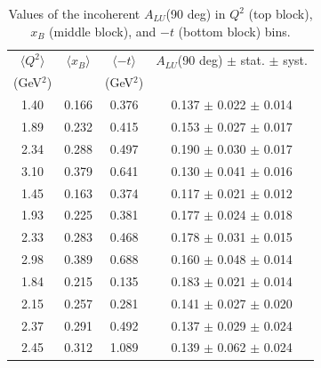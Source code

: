 \documentclass[aps,prc,preprint,superscriptaddress]{revtex4}
\begin{document}
\begin{table}[!h]
\begin{center}
\begin{tabular}{|c|c|c|c|}
\hline
 $\langle Q^{2} \rangle$ & $\langle x_{B} \rangle$ & $\langle -t \rangle$  & $A_{LU}$(90 deg) $\pm$ stat. $\pm$ syst.\\
 (GeV$^{2}$) &           & (GeV$^{2}$) &  \\
 \hline 
  1.40  & 0.166 & 0.376 & 0.137  $\pm$ 0.022  $\pm$ 0.014 \\   
  1.89  & 0.232 & 0.415 & 0.153  $\pm$ 0.027  $\pm$ 0.017 \\   
  2.34  & 0.288 & 0.497 & 0.190  $\pm$ 0.030  $\pm$ 0.017 \\   
  3.10  & 0.379 & 0.641 & 0.130  $\pm$ 0.041  $\pm$ 0.016 \\   
 \hline 
  1.45  & 0.163 & 0.374 & 0.117  $\pm$ 0.021  $\pm$ 0.012 \\   
  1.93  & 0.225 & 0.381 & 0.177  $\pm$ 0.024  $\pm$ 0.018 \\   
  2.33  & 0.283 & 0.468 & 0.178  $\pm$ 0.031  $\pm$ 0.015 \\   
  2.98  & 0.389 & 0.688 & 0.160  $\pm$ 0.048  $\pm$ 0.014 \\   
 \hline 
  1.84  & 0.215 & 0.135 & 0.183  $\pm$ 0.021  $\pm$ 0.014 \\   
  2.15  & 0.257 & 0.281 & 0.141  $\pm$ 0.027  $\pm$ 0.020 \\   
  2.37  & 0.291 & 0.492 & 0.137  $\pm$ 0.029  $\pm$ 0.024 \\   
  2.45  & 0.312 & 1.089 & 0.139  $\pm$ 0.062  $\pm$ 0.024 \\   
 \hline
 \end{tabular}
 \caption{Values of the incoherent $A_{LU}$(90 deg) in $Q^2$ (top block), $x_B$ (middle block), and $-t$ (bottom block) bins.}
 \label{table:InCoh_BSA_90}
 \end{center}
\end{table}
\end{document}
